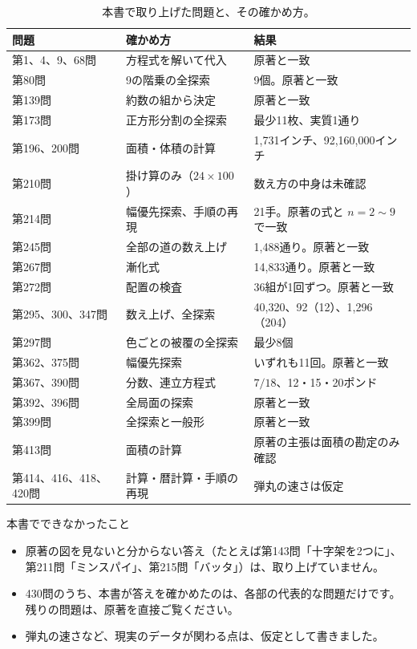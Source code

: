 \documentclass[a4paper,11pt,openany]{ltjsbook}
\begin{document}
\begin{table}[htbp]
\centering
\small
\begin{tabular}{lll}
\toprule
問題 & 確かめ方 & 結果\\
\midrule
第1、4、9、68問 & 方程式を解いて代入 & 原著と一致\\
第80問 & 9の階乗の全探索 & 9個。原著と一致\\
第139問 & 約数の組から決定 & 原著と一致\\
第173問 & 正方形分割の全探索 & 最少11枚、実質1通り\\
第196、200問 & 面積・体積の計算 & 1,731インチ、92,160,000インチ\\
第210問 & 掛け算のみ（$24\times100$） & 数え方の中身は未確認\\
第214問 & 幅優先探索、手順の再現 & 21手。原著の式と $n=2\sim9$ で一致\\
第245問 & 全部の道の数え上げ & 1,488通り。原著と一致\\
第267問 & 漸化式 & 14,833通り。原著と一致\\
第272問 & 配置の検査 & 36組が1回ずつ。原著と一致\\
第295、300、347問 & 数え上げ、全探索 & 40,320、92（12）、1,296（204）\\
第297問 & 色ごとの被覆の全探索 & 最少8個\\
第362、375問 & 幅優先探索 & いずれも11回。原著と一致\\
第367、390問 & 分数、連立方程式 & $7/18$、12・15・20ポンド\\
第392、396問 & 全局面の探索 & 原著と一致\\
第399問 & 全探索と一般形 & 原著と一致\\
第413問 & 面積の計算 & 原著の主張は面積の勘定のみ確認\\
第414、416、418、420問 & 計算・暦計算・手順の再現 & 弾丸の速さは仮定\\
\bottomrule
\end{tabular}
\caption{本書で取り上げた問題と、その確かめ方。}
\end{table}

\begin{notebox}{本書でできなかったこと}
\begin{itemize}[leftmargin=*]
\item 原著の図を見ないと分からない答え（たとえば第143問「十字架を2つに」、第211問「ミンスパイ」、第215問「バッタ」）は、取り上げていません。
\item 430問のうち、本書が答えを確かめたのは、各部の代表的な問題だけです。残りの問題は、原著を直接ご覧ください。
\item 弾丸の速さなど、現実のデータが関わる点は、仮定として書きました。
\end{itemize}
\end{notebox}
\end{document}
